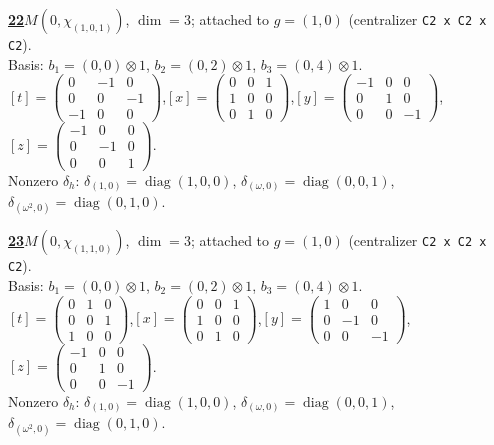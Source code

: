 \begin{samepage}\noindent\textbf{\underline{22}}\quad $M(0,\chi_{(1,0,1)})$, $\dim=3$; attached to $g=(1,0)$ (centralizer \texttt{C2 x C2 x C2}).\\
Basis: $b_{1}=(0,0)\otimes 1$, $b_{2}=(0,2)\otimes 1$, $b_{3}=(0,4)\otimes 1$.\\
$[t]=\left(\begin{smallmatrix} 0 & -1 & 0 \\ 0 & 0 & -1 \\ -1 & 0 & 0 \end{smallmatrix}\right)$,\quad $[x]=\left(\begin{smallmatrix} 0 & 0 & 1 \\ 1 & 0 & 0 \\ 0 & 1 & 0 \end{smallmatrix}\right)$,\quad $[y]=\left(\begin{smallmatrix} -1 & 0 & 0 \\ 0 & 1 & 0 \\ 0 & 0 & -1 \end{smallmatrix}\right)$,\quad $[z]=\left(\begin{smallmatrix} -1 & 0 & 0 \\ 0 & -1 & 0 \\ 0 & 0 & 1 \end{smallmatrix}\right)$.\\
Nonzero $\delta_h$: $\delta_{(1,0)}=\operatorname{diag}(1,0,0)$, $\delta_{(\omega,0)}=\operatorname{diag}(0,0,1)$, $\delta_{(\omega^2,0)}=\operatorname{diag}(0,1,0)$.\end{samepage}
\medskip

\begin{samepage}\noindent\textbf{\underline{23}}\quad $M(0,\chi_{(1,1,0)})$, $\dim=3$; attached to $g=(1,0)$ (centralizer \texttt{C2 x C2 x C2}).\\
Basis: $b_{1}=(0,0)\otimes 1$, $b_{2}=(0,2)\otimes 1$, $b_{3}=(0,4)\otimes 1$.\\
$[t]=\left(\begin{smallmatrix} 0 & 1 & 0 \\ 0 & 0 & 1 \\ 1 & 0 & 0 \end{smallmatrix}\right)$,\quad $[x]=\left(\begin{smallmatrix} 0 & 0 & 1 \\ 1 & 0 & 0 \\ 0 & 1 & 0 \end{smallmatrix}\right)$,\quad $[y]=\left(\begin{smallmatrix} 1 & 0 & 0 \\ 0 & -1 & 0 \\ 0 & 0 & -1 \end{smallmatrix}\right)$,\quad $[z]=\left(\begin{smallmatrix} -1 & 0 & 0 \\ 0 & 1 & 0 \\ 0 & 0 & -1 \end{smallmatrix}\right)$.\\
Nonzero $\delta_h$: $\delta_{(1,0)}=\operatorname{diag}(1,0,0)$, $\delta_{(\omega,0)}=\operatorname{diag}(0,0,1)$, $\delta_{(\omega^2,0)}=\operatorname{diag}(0,1,0)$.\end{samepage}
\medskip

